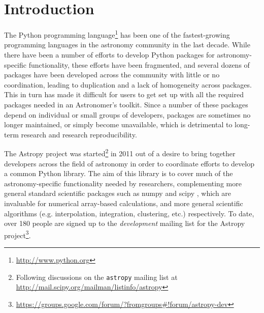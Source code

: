 \documentclass[traditabstract]{aa}
\begin{document}

\maketitle



\section{Introduction}


The Python programming language\footnote{\url{http://www.python.org}} has been
one of the fastest-growing programming languages in the astronomy community in
the last decade. While there have been a number of efforts to develop Python
packages for astronomy-specific functionality, these efforts have been
fragmented, and several dozens of packages have been developed across the
community with little or no coordination, leading to duplication and a lack of
homogeneity across packages. This in turn has made it difficult for users to
get set up with all the required packages needed in an Astronomer's toolkit.
Since a number of these packages depend on individual or small groups of
developers, packages are sometimes no longer maintained, or simply become
unavailable, which is detrimental to long-term research and research
reproducibility.

The Astropy project was started\footnote{Following discussions on
the \texttt{astropy} mailing list at
\url{http://mail.scipy.org/mailman/listinfo/astropy}} in 2011 out of a desire
to bring together developers across the field of astronomy in order to
coordinate efforts to develop a common Python library. The aim of this library
is to cover much of the astronomy-specific functionality needed by
researchers, complementing more general standard scientific packages such as
\gls{numpy} and \gls{scipy} ,
which are invaluable for numerical array-based calculations, and more general
scientific algorithms (e.g. interpolation, integration, clustering, etc.)
respectively. To date, over 180 people are signed up to the
\textit{development} mailing list for the Astropy project\footnote{
\url{https://groups.google.com/forum/?fromgroups\#!forum/astropy-dev}}.
\end{document}
